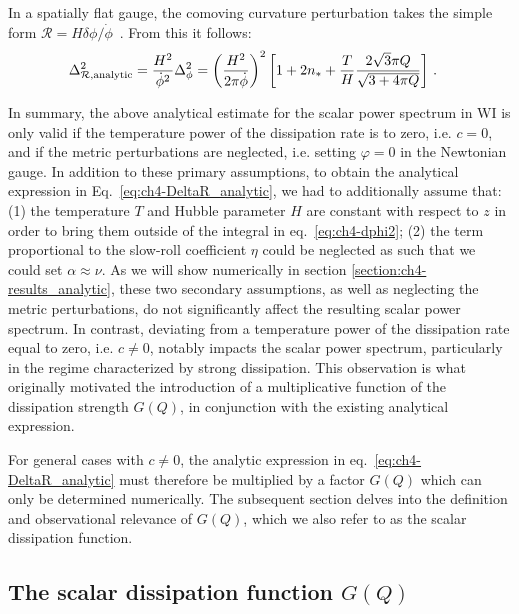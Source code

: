 In a spatially flat gauge, the comoving curvature perturbation takes the simple form $\mathcal{R}= H\delta\phi/\dot{\phi}$~\cite{liddle_lyth_2000}. From this it follows:
\begin{align}
\Delta_{\mathcal{R},\rm{analytic}}^2&=\frac{H^2}{\dot{\phi}^2}\Delta_{\phi}^2=\left(\frac{H^2}{2\pi \dot{\phi}}\right)^2\left[1+2n_{\mathrm{*}}+\frac{T}{H}\frac{2\sqrt{3}\pi Q}{\sqrt{3+4\pi Q}} \right]\,.
    \label{eq:ch4-DeltaR_analytic}
\end{align}

In summary, the above analytical estimate for the scalar power spectrum in WI is only valid if the temperature power of the dissipation rate is to zero, i.e. $c = 0$, and if the
metric perturbations are neglected, i.e. setting $\varphi=0$ in the Newtonian gauge. In addition to these primary assumptions, to obtain the analytical expression in Eq.~\eqref{eq:ch4-DeltaR_analytic}, we had to additionally assume that: (1) the temperature $T$ and Hubble parameter $H$ are constant with respect to $z$ in order to bring them outside of the integral in eq.~\eqref{eq:ch4-dphi2}; (2) the term proportional to the slow-roll coefficient $\eta$ could be neglected as such that we could set $\alpha\approx\nu$. As we will show numerically in section \ref{section:ch4-results_analytic}, these two secondary assumptions, as well as neglecting the metric perturbations, do not significantly affect the resulting scalar power spectrum. In contrast, deviating from a temperature power of the dissipation rate equal to zero, i.e. $c\neq 0$, notably impacts the scalar power spectrum, particularly in the regime characterized by strong dissipation. This observation is what originally motivated the introduction of a multiplicative function of the dissipation strength $G(Q)$, in conjunction with the existing analytical expression. 

For general cases with $c \neq 0$, the analytic expression in eq.~\eqref{eq:ch4-DeltaR_analytic} must therefore be multiplied by a factor $G(Q)$
which can only be determined numerically.
The subsequent section delves into the definition and observational relevance of $G(Q)$, which we also refer to as the scalar dissipation function. 


\subsection{The scalar dissipation function $G(Q)$ \label{sec:ch4-GQ_def}}

